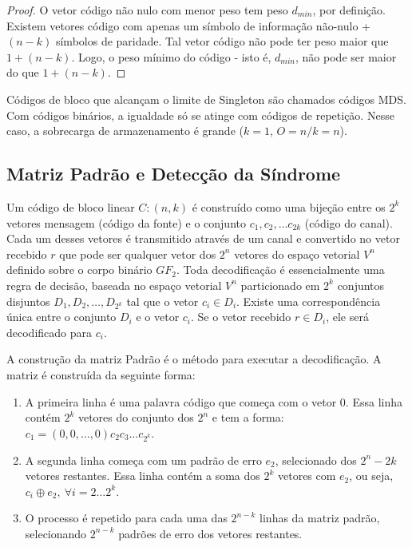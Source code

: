\begin{proof}  O vetor código não nulo com menor peso tem peso $d_{min}$, por definição. Existem vetores código com apenas um símbolo de informação não-nulo + $(n - k)$ símbolos de paridade. Tal vetor código não pode ter peso maior que $1+(n-k)$. Logo, o peso mínimo do código - isto é, $d_{min}$, não
pode ser maior do que $1 + (n - k)$.
\end{proof}

Códigos de bloco que alcançam o limite de Singleton são chamados códigos MDS. Com códigos binários, a igualdade só se atinge com códigos de repetição. Nesse caso, a sobrecarga de armazenamento é grande ($k = 1$, $O = n/k = n$).

\subsection{Matriz Padrão e Detecção da Síndrome}

Um código de bloco linear $C:(n,k)$ é construído como uma bijeção entre os $2^k$ vetores mensagem (código da fonte) e o conjunto $c_1 , c_2 , \ldots c_{2k}$ (código do canal). Cada um desses vetores é transmitido através de um canal e convertido no vetor recebido $r$ que pode ser qualquer vetor dos $2^n$ vetores do espaço vetorial $V^n$ definido sobre o corpo binário $GF_{2}$. Toda decodificação é essencialmente uma regra de decisão, baseada no espaço vetorial $V^n$ particionado em $2^k$ conjuntos disjuntos $D_1 , D_2 , \ldots , D_{2^k}$ tal que o vetor $c_i \in D_i$. Existe uma correspondência única entre o conjunto $D_i$ e o vetor $c_i$. Se o vetor recebido $r \in D_i$, ele será decodificado para $c_i$.

A construção da matriz Padrão é o método para executar a decodificação. A matriz é construída da seguinte forma:

\begin{enumerate}
   \item A primeira linha é uma palavra código que começa com o vetor $0$. Essa linha contém $2^k$ vetores do conjunto dos $2^n$ e tem a forma: $c_1=(0,0, \ldots,0)c_2c_3 \ldots c_{2^k}$.
   \item A segunda linha começa com um padrão de erro $e_2$, selecionado dos $2^n-2k$ vetores restantes. Essa linha contém a soma dos $2^k$ vetores com $e_2$, ou seja, $c_i \oplus e_2,\ \forall i=2 \ldots 2^k$.
   \item O processo é repetido para cada uma das $2^{n-k}$ linhas da matriz padrão, selecionando $2^{n-k}$ padrões de erro dos vetores restantes.
\end{enumerate}

